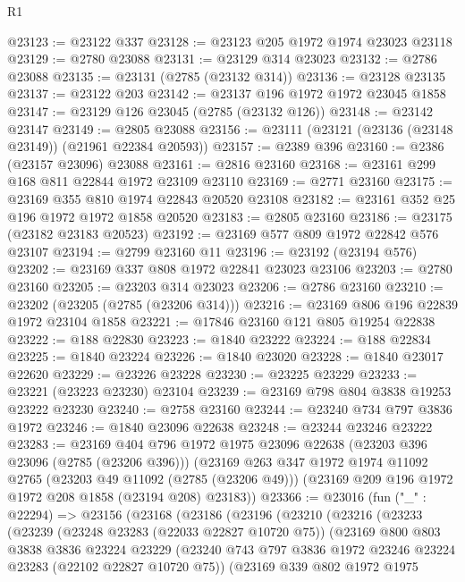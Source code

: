 \begin{lexlean}{R1}
\begin{coremodule}
@23123 := @23122 @337
@23128 := @23123 @205 @1972 @1974 @23023 @23118
@23129 := @2780 @23088
@23131 := @23129 @314 @23023
@23132 := @2786 @23088
@23135 := @23131 (@2785 (@23132 @314))
@23136 := @23128 @23135
@23137 := @23122 @203
@23142 := @23137 @196 @1972 @1972 @23045 @1858
@23147 := @23129 @126 @23045 (@2785 (@23132 @126))
@23148 := @23142 @23147
@23149 := @2805 @23088
@23156 := @23111 (@23121 (@23136 (@23148 @23149)) (@21961 @22384 @20593))
@23157 := @2389 @396
@23160 := @2386 (@23157 @23096) @23088
@23161 := @2816 @23160
@23168 := @23161 @299 @168 @811 @22844 @1972 @23109 @23110
@23169 := @2771 @23160
@23175 := @23169 @355 @810 @1974 @22843 @20520 @23108
@23182 := @23161 @352 @25 @196 @1972 @1972 @1858 @20520
@23183 := @2805 @23160
@23186 := @23175 (@23182 @23183 @20523)
@23192 := @23169 @577 @809 @1972 @22842 @576 @23107
@23194 := @2799 @23160 @11
@23196 := @23192 (@23194 @576)
@23202 := @23169 @337 @808 @1972 @22841 @23023 @23106
@23203 := @2780 @23160
@23205 := @23203 @314 @23023
@23206 := @2786 @23160
@23210 := @23202 (@23205 (@2785 (@23206 @314)))
@23216 := @23169 @806 @196 @22839 @1972 @23104 @1858
@23221 := @17846 @23160 @121 @805 @19254 @22838
@23222 := @188 @22830
@23223 := @1840 @23222
@23224 := @188 @22834
@23225 := @1840 @23224
@23226 := @1840 @23020
@23228 := @1840 @23017 @22620
@23229 := @23226 @23228
@23230 := @23225 @23229
@23233 := @23221 (@23223 @23230) @23104
@23239 := @23169 @798 @804 @3838 @19253 @23222 @23230
@23240 := @2758 @23160
@23244 := @23240 @734 @797 @3836 @1972
@23246 := @1840 @23096 @22638
@23248 := @23244 @23246 @23222
@23283 := @23169
    @404
    @796
    @1972
    @1975
    @23096
    @22638
    (@23203 @396 @23096 (@2785 (@23206 @396)))
    (@23169
      @263
      @347
      @1972
      @1974
      @11092
      @2765
      (@23203 @49 @11092 (@2785 (@23206 @49)))
      (@23169 @209 @196 @1972 @1972 @208 @1858 (@23194 @208) @23183))
@23366 := @23016
    (fun ("_" : @22294) =>
    @23156
      (@23168
        (@23186
          (@23196
            (@23210
              (@23216
                (@23233
                  (@23239
                    (@23248 @23283 (@22033 @22827 @10720 @75))
                    (@23169
                      @800
                      @803
                      @3838
                      @3836
                      @23224
                      @23229
                      (@23240 @743 @797 @3836 @1972 @23246 @23224 @23283 (@22102 @22827 @10720 @75))
                      (@23169
                        @339
                        @802
                        @1972
                        @1975

\end{coremodule}
\end{lexlean}
